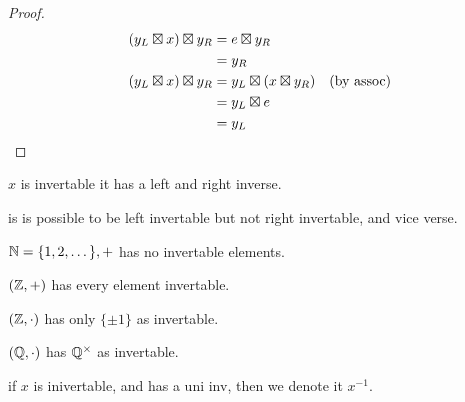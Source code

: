 \documentclass[12pt]{article}
\begin{document}
\bboxproof
\begin{proof}
  \begin{equation*}
    \begin{split}
      (y_L\boxtimes x)\boxtimes y_R &=e\boxtimes y_R\\
                          &=y_R\\
      (y_L\boxtimes x)\boxtimes y_R&=y_L\boxtimes(x\boxtimes y_R)\quad\text{(by assoc)}\\
                         &=y_L\boxtimes e\\
                         &=y_L
    \end{split}
  \end{equation*}
\end{proof}
\ebox

\bboxnote
{} \(x\) is invertable  it has a left and right
inverse.
\ebox

\bboxnote
{} is is possible to be left invertable but not right invertable, and
vice verse.
\ebox

\bboxex
\(\mathbb N=\{1,2,\dots\},+\) has no invertable elements.

\((\mathbb Z,+)\) has every element invertable.

\((\mathbb Z,\cdot)\) has only \(\{\pm 1\}\) as invertable.

\((\mathbb Q,\cdot)\) has \(\mathbb Q^\times\) as invertable.
\ebox

\bboxnote
\begin{nota}[Inverse]\label{nota:inv}
  if \(x\) is inivertable, and has a uni inv, then we denote it
  \(x^{-1}\).
\end{nota}
\ebox
\end{document}
